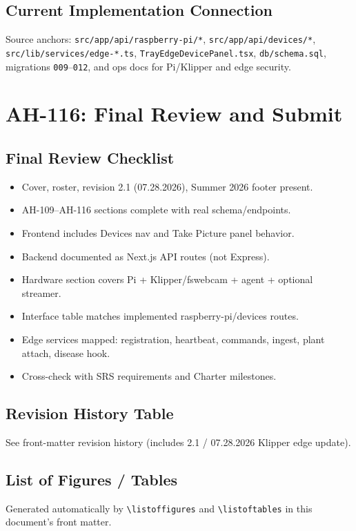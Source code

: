 \documentclass[11pt,letterpaper]{article}
\begin{document}
\subsection{Current Implementation Connection}
Source anchors: \texttt{src/app/api/raspberry-pi/*}, \texttt{src/app/api/devices/*},
\texttt{src/lib/services/edge-*.ts}, \texttt{TrayEdgeDevicePanel.tsx}, \texttt{db/schema.sql},
migrations \texttt{009}--\texttt{012}, and ops docs for Pi/Klipper and edge security.

\section{AH-116: Final Review and Submit}

\subsection{Final Review Checklist}
\begin{itemize}
  \item[$\square$] Cover, roster, revision 2.1 (07.28.2026), Summer 2026 footer present.
  \item[$\square$] AH-109--AH-116 sections complete with real schema/endpoints.
  \item[$\square$] Frontend includes Devices nav and Take Picture panel behavior.
  \item[$\square$] Backend documented as Next.js API routes (not Express).
  \item[$\square$] Hardware section covers Pi + Klipper/fswebcam + agent + optional streamer.
  \item[$\square$] Interface table matches implemented raspberry-pi/devices routes.
  \item[$\square$] Edge services mapped: registration, heartbeat, commands, ingest, plant
        attach, disease hook.
  \item[$\square$] Cross-check with SRS requirements and Charter milestones.
\end{itemize}

\subsection{Revision History Table}
See front-matter revision history (includes 2.1 / 07.28.2026 Klipper edge update).

\subsection{List of Figures / Tables}
Generated automatically by \texttt{\textbackslash listoffigures} and
\texttt{\textbackslash listoftables} in this document's front matter.
\end{document}
